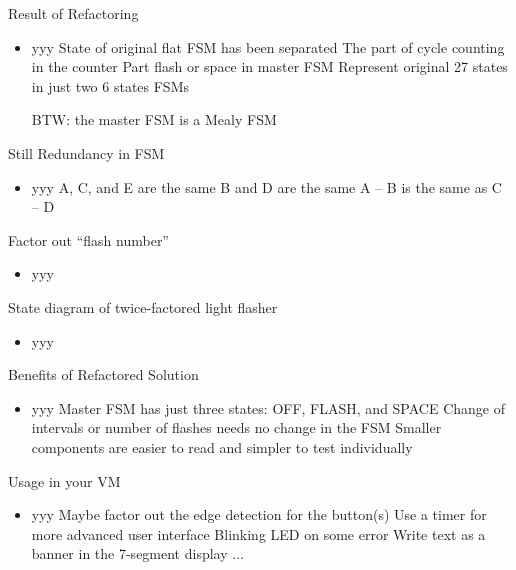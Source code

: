 \begin{frame}[fragile]{Result of Refactoring}
\begin{itemize}
\item yyy
State of original flat FSM has been separated
The part of cycle counting in the counter
Part flash or space in master FSM
Represent original 27 states in just two 6 states FSMs

BTW: the master FSM is a Mealy FSM
\end{itemize}
\end{frame}

\begin{frame}[fragile]{Still Redundancy in FSM}
\begin{itemize}
\item yyy
A, C, and E are the same
B and D are the same
A -- B is the same as C -- D
\end{itemize}
\end{frame}

\begin{frame}[fragile]{Factor out ``flash number''}
\begin{itemize}
\item yyy
\end{itemize}
\end{frame}

\begin{frame}[fragile]{State diagram of twice-factored light flasher}
\begin{itemize}
\item yyy
\end{itemize}
\end{frame}

\begin{frame}[fragile]{Benefits of Refactored Solution}
\begin{itemize}
\item yyy
Master FSM has just three states: OFF, FLASH, and SPACE
Change of intervals or number of flashes needs no change in the FSM
Smaller components are easier to read and simpler to test individually

\end{itemize}
\end{frame}

\begin{frame}[fragile]{Usage in your VM}
\begin{itemize}
\item yyy
Maybe factor out the edge detection for the button(s)
Use a timer for more advanced user interface
Blinking LED on some error
Write text as a banner in the 7-segment display
...
\end{itemize}
\end{frame}

